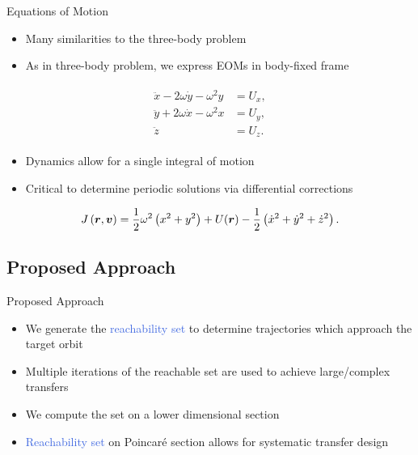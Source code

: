 \documentclass[11pt,professionalfonts]{beamer}
\def\Emph{\textcolor{RoyalBlue}}
\begin{document}
\begin{frame}{Equations of Motion}

\begin{itemize}
    \item Many similarities to the three-body problem
    \item As in three-body problem, we express EOMs in body-fixed frame
\end{itemize}

\begin{align} \label{eq:eoms}
    \begin{split}
        \ddot{x} - 2 \omega \dot{y} - \omega^2 y &= U_x , \\
        \ddot{y} + 2 \omega \dot{x} - \omega^2 x &= U_y , \\
        \ddot{z} &= U_z .
    \end{split}
\end{align}
\pause
\begin{itemize}
    \item Dynamics allow for a single integral of motion 
    \item Critical to determine periodic solutions via differential corrections
\end{itemize}

\begin{align}\label{eq:jacobi}
    J \left( \bm{r}, \bm{v} \right) = \frac{1}{2} \omega^2 \left( x^2 + y^2 \right) + U(\bm{r}) - \frac{1}{2} \left( \dot{x}^2 + \dot{y}^2 + \dot{z}^2 \right) .
\end{align}

\end{frame}


\subsection*{Proposed Approach}

\begin{frame}{Proposed Approach} %
  \begin{itemize}
      \item We generate the \Emph{reachability set} to determine trajectories which approach the target orbit
      \item Multiple iterations of the reachable set are used to achieve large/complex transfers
      \item We compute the set on a lower dimensional \Poincare section 
      \item \Emph{Reachability set} on Poincar\'e section allows for systematic transfer design
  \end{itemize}
\end{frame} %
\end{document}
